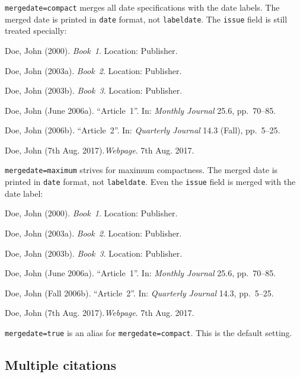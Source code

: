 \documentclass[a4paper]{article}
\newenvironment{bibsample}
  {\trivlist\samepage
   \setlength{\itemsep}{0pt}}
  {\endtrivlist}
\begin{document}
\texttt{mergedate=compact} merges all date specifications with the
date labels. The merged date is printed in \texttt{date} format,
not \texttt{labeldate}. The \texttt{issue} field is still treated specially:

\begin{bibsample}
\item Doe, John (2000). \emph{Book~1}. Location: Publisher.
\item Doe, John (2003a). \emph{Book~2}. Location: Publisher.
\item Doe, John (2003b). \emph{Book~3}. Location: Publisher.
\item Doe, John (June 2006a). \enquote{Article~1}. In: \emph{Monthly Journal} 25.6, pp.~70--85.
\item Doe, John (2006b). \enquote{Article~2}. In: \emph{Quarterly Journal} 14.3
(Fall), pp.~5--25.
\item Doe, John (7th Aug. 2017).\emph{Webpage}. 7th Aug. 2017.
\end{bibsample}

\texttt{mergedate=maximum} strives for maximum compactness.
The merged date is printed in \texttt{date} format, not
\texttt{labeldate}.
Even the \texttt{issue} field is merged with the date label:

\begin{bibsample}
\item Doe, John (2000). \emph{Book~1}. Location: Publisher.
\item Doe, John (2003a). \emph{Book~2}. Location: Publisher.
\item Doe, John (2003b). \emph{Book~3}. Location: Publisher.
\item Doe, John (June 2006a). \enquote{Article~1}. In: \emph{Monthly Journal} 25.6, pp.~70--85.
\item Doe, John (Fall 2006b). \enquote{Article~2}. In: \emph{Quarterly Journal} 14.3, pp.~5--25.
\item Doe, John (7th Aug. 2017).\emph{Webpage}. 7th Aug. 2017.
\end{bibsample}

\texttt{mergedate=true} is an alias for \texttt{mergedate=compact}.
This is the default setting.

\subsection*{Multiple citations}

\cite{knuth:ct:c,aristotle:physics,knuth:ct:b,aristotle:poetics,aristotle:rhetoric,knuth:ct:d}

\clearpage
\printbibliography
\end{document}
